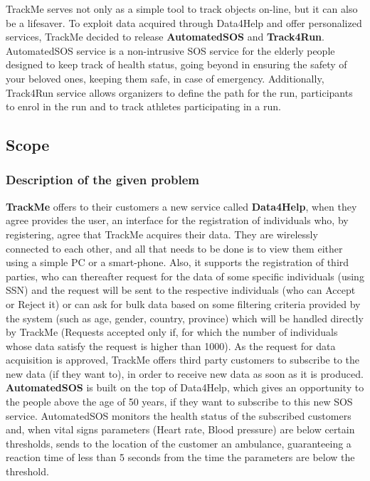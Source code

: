 \documentclass[12pt]{article}
\begin{document}
TrackMe serves not only as a simple tool to track objects on-line, but it can also be a lifesaver. To exploit data acquired through Data4Help and offer personalized services, TrackMe decided to release \textbf{AutomatedSOS} and \textbf{Track4Run}. AutomatedSOS service is a non-intrusive SOS service for the elderly people designed to keep track of health status, going beyond in ensuring the safety of your beloved ones, keeping them safe, in case of emergency. Additionally, Track4Run service allows organizers to define the path for the run, participants to enrol in the run and to track athletes participating in a run.\\

\subsection{Scope}

\subsubsection{Description of the given problem}
\textbf{TrackMe} offers to their customers a new service called \textbf{Data4Help}, when they agree provides the user, an interface for the registration of individuals who, by registering, agree that TrackMe acquires their data. They are wirelessly connected to each other, and all that needs to be done is to view them either using a simple PC or a smart-phone. Also, it supports the registration of third parties, who can thereafter request for the data of some specific individuals (using SSN) and the request will be sent to the respective individuals (who can Accept or Reject it) or can ask for bulk data based on some filtering criteria provided by the system (such as age, gender, country, province) which will be handled directly by TrackMe (Requests accepted only if, for which the number of individuals whose data satisfy the request is higher than 1000). As the request for data acquisition is approved, TrackMe offers third party customers to subscribe to the new data (if they want to), in order to receive new data as soon as it is produced.\\

\textbf{AutomatedSOS} is built on the top of Data4Help, which gives an opportunity to the people above the age of 50 years, if they want to subscribe to this new SOS service. AutomatedSOS monitors the health status of the subscribed customers and, when vital signs parameters (Heart rate, Blood pressure) are below certain thresholds, sends to the location of the customer an ambulance, guaranteeing a reaction time of less than 5 seconds from the time the parameters	are	below the threshold.\\
\end{document}
